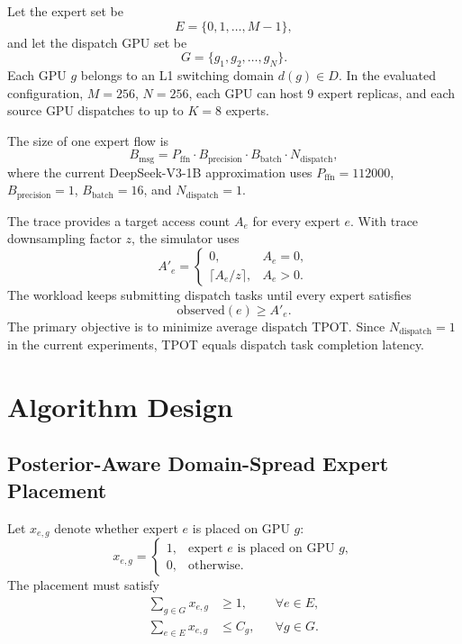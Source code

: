 \documentclass[10pt,conference]{IEEEtran}
\begin{document}
Let the expert set be
\begin{equation}
E = \{0,1,\ldots,M-1\},
\end{equation}
and let the dispatch GPU set be
\begin{equation}
G = \{g_1,g_2,\ldots,g_N\}.
\end{equation}
Each GPU $g$ belongs to an L1 switching domain $d(g) \in D$. In the evaluated configuration, $M=256$, $N=256$, each GPU can host 9 expert replicas, and each source GPU dispatches to up to $K=8$ experts.

The size of one expert flow is
\begin{equation}
B_{\mathrm{msg}} =
P_{\mathrm{ffn}} \cdot B_{\mathrm{precision}} \cdot B_{\mathrm{batch}} \cdot N_{\mathrm{dispatch}},
\end{equation}
where the current DeepSeek-V3-1B approximation uses $P_{\mathrm{ffn}}=112000$, $B_{\mathrm{precision}}=1$, $B_{\mathrm{batch}}=16$, and $N_{\mathrm{dispatch}}=1$.

The trace provides a target access count $A_e$ for every expert $e$. With trace downsampling factor $z$, the simulator uses
\begin{equation}
A'_e =
\begin{cases}
0, & A_e = 0,\\
\lceil A_e/z \rceil, & A_e > 0.
\end{cases}
\end{equation}
The workload keeps submitting dispatch tasks until every expert satisfies
\begin{equation}
\mathrm{observed}(e) \ge A'_e.
\end{equation}
The primary objective is to minimize average dispatch TPOT. Since $N_{\mathrm{dispatch}}=1$ in the current experiments, TPOT equals dispatch task completion latency.

\section{Algorithm Design}

\subsection{Posterior-Aware Domain-Spread Expert Placement}

Let $x_{e,g}$ denote whether expert $e$ is placed on GPU $g$:
\begin{equation}
x_{e,g} =
\begin{cases}
1, & \text{expert } e \text{ is placed on GPU } g,\\
0, & \text{otherwise.}
\end{cases}
\end{equation}
The placement must satisfy
\begin{align}
\sum_{g \in G} x_{e,g} &\ge 1, && \forall e \in E,\\
\sum_{e \in E} x_{e,g} &\le C_g, && \forall g \in G.
\end{align}
\end{document}
